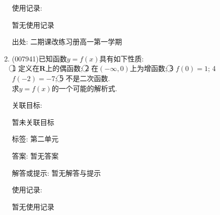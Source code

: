 \documentclass[10pt,a4paper]{article}
\begin{document}
\begin{enumerate}[1.]
使用记录:

暂无使用记录


出处: 二期课改练习册高一第一学期
\item { (007941)}已知函数$y=f(x)$具有如下性质:\\
\textcircled{1} 定义在$\mathbf{R}$上的偶函数; \textcircled{2} 在$(-\infty ,0)$上为增函数; \textcircled{3} $f(0)=1$; \textcircled{4} $f(-2)=-7$; \textcircled{5} 不是二次函数.\\
求$y=f(x)$的一个可能的解析式.


关联目标:

暂未关联目标



标签: 第二单元

答案: 暂无答案

解答或提示: 暂无解答与提示

使用记录:

暂无使用记录



\end{enumerate}
\end{document}

